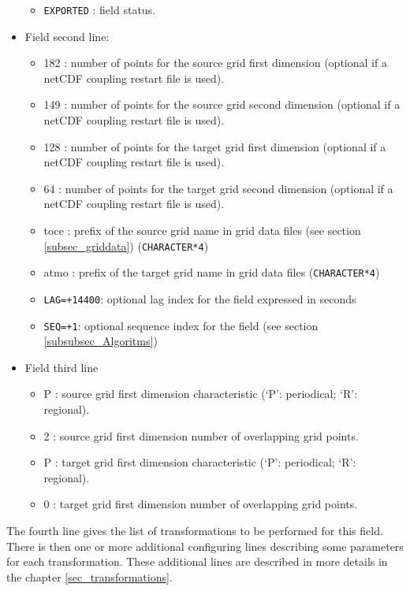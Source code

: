 \begin{itemize}
\begin{itemize}
        \item {\tt EXPORTED} : field status.
        \end{itemize}
      \item Field second line:
        \begin{itemize}
        \item 182 : number of points for the source grid first
        dimension (optional if a netCDF coupling restart file is used). 
        \item 149 : number of points for the source grid second
        dimension (optional if a netCDF coupling restart file is used).    
        \item 128 : number of points for the target grid first
        dimension (optional if a netCDF coupling restart file is used). 
        \item 64 : number of points for the target grid second
        dimension (optional if a netCDF coupling restart file is used).  
        \item toce : prefix of the source grid name in grid data files (see section
        \ref{subsec_griddata}) ({\tt CHARACTER*4})
        \item atmo : prefix of the target grid name in grid data files
        ({\tt CHARACTER*4})
        \item {\tt LAG=+14400}: optional lag index for the field
        expressed in seconds 
        \item {\tt SEQ=+1}: optional sequence index for the field (see section  \ref{subsubsec_Algoritms})
        \end{itemize}
      \item Field third line
        \begin{itemize}
         \item P : source grid first dimension characteristic
            (`P': periodical; `R': regional).
         \item 2 : source grid first dimension number of overlapping grid points.
         \item P : target grid first dimension characteristic (`P':
         periodical; `R': regional).
         \item 0 : target grid first dimension number of overlapping grid points.
        \end{itemize}
     
      \end{itemize}
    
  The fourth line gives the list of transformations to be performed
  for this field. There is then one or more additional configuring lines
  describing some parameters for each transformation. These
  additional lines are described in more details in the chapter
  \ref{sec_transformations}.

